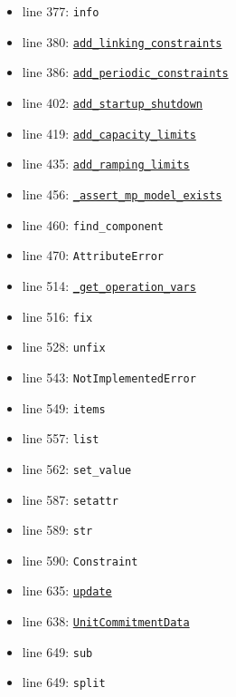 \documentclass[11pt]{report}
\begin{document}
\begin{itemize}[leftmargin=*]
  \item line 377: \texttt{info}
  \item line 380: \hyperref[def:pricetaker-price_taker_model.py:PriceTakerModel.add_linking_constraints:L564]{\texttt{add\_linking\_constraints}}
  \item line 386: \hyperref[def:pricetaker-price_taker_model.py:PriceTakerModel.add_periodic_constraints:L598]{\texttt{add\_periodic\_constraints}}
  \item line 402: \hyperref[def:pricetaker-price_taker_model.py:PriceTakerModel.add_startup_shutdown:L813]{\texttt{add\_startup\_shutdown}}
  \item line 419: \hyperref[def:pricetaker-price_taker_model.py:PriceTakerModel.add_capacity_limits:L654]{\texttt{add\_capacity\_limits}}
  \item line 435: \hyperref[def:pricetaker-price_taker_model.py:PriceTakerModel.add_ramping_limits:L723]{\texttt{add\_ramping\_limits}}
  \item line 456: \hyperref[def:pricetaker-price_taker_model.py:PriceTakerModel._assert_mp_model_exists:L283]{\texttt{\_assert\_mp\_model\_exists}}
  \item line 460: \texttt{find\_component}
  \item line 470: \texttt{AttributeError}
  \item line 514: \hyperref[def:pricetaker-price_taker_model.py:PriceTakerModel._get_operation_vars:L482]{\texttt{\_get\_operation\_vars}}
  \item line 516: \texttt{fix}
  \item line 528: \texttt{unfix}
  \item line 543: \texttt{NotImplementedError}
  \item line 549: \texttt{items}
  \item line 557: \texttt{list}
  \item line 562: \texttt{set\_value}
  \item line 587: \texttt{setattr}
  \item line 589: \texttt{str}
  \item line 590: \texttt{Constraint}
  \item line 635: \hyperref[def:pricetaker-unit_commitment.py:UnitCommitmentData.update:L84]{\texttt{update}}
  \item line 638: \hyperref[def:pricetaker-unit_commitment.py:UnitCommitmentData:L26]{\texttt{UnitCommitmentData}}
  \item line 649: \texttt{sub}
  \item line 649: \texttt{split}

\end{itemize}
\end{document}
